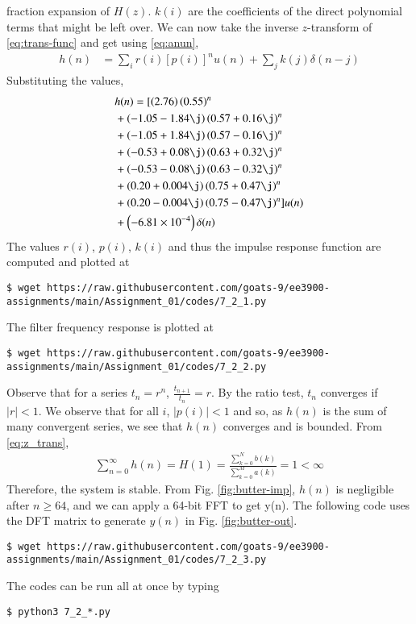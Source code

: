 \documentclass[journal,12pt,twocolumn]{IEEEtran}
\renewcommand\thesection{\arabic{section}}
\begin{document}
\begin{enumerate}[label=\thesection.\arabic*]
fraction expansion of $H(z)$. $k(i)$ are the coefficients of the direct polynomial 
terms that might be left over. We can now take the inverse $z$-transform of
\eqref{eq:trans-func} and get using \eqref{eq:anun},
\begin{align}
	h(n) &= \sum_{i}r(i)[p(i)]^nu(n) + \sum_{j}k(j)\delta(n - j)
	\label{eq:h-n-expr}
\end{align}
Substituting the values,
\begin{align}
	&h(n) = [\brak{2.76}\brak{0.55}^n \nonumber \\ 
	&+ \brak{-1.05-1.84\j}\brak{0.57+0.16\j}^n \nonumber \\
	&+ \brak{-1.05+1.84\j}\brak{0.57-0.16\j}^n \nonumber \\
	&+ \brak{-0.53+0.08\j}\brak{0.63+0.32\j}^n \nonumber \\
	&+ \brak{-0.53-0.08\j}\brak{0.63-0.32\j}^n \nonumber \\
	&+ \brak{0.20+0.004\j}\brak{0.75+0.47\j}^n \nonumber \\
	&+ \brak{0.20-0.004\j}\brak{0.75-0.47\j}^n]u(n) \nonumber \\
	&+ \brak{-6.81 \times 10^{-4}}\delta(n)
\end{align}
The values $r(i)$, $p(i)$, $k(i)$ and thus the impulse response function are computed and plotted at
\begin{lstlisting}
$ wget https://raw.githubusercontent.com/goats-9/ee3900-assignments/main/Assignment_01/codes/7_2_1.py
\end{lstlisting}
The filter frequency response is plotted at
\begin{lstlisting}
$ wget https://raw.githubusercontent.com/goats-9/ee3900-assignments/main/Assignment_01/codes/7_2_2.py
\end{lstlisting}
Observe that for a series $t_n = r^n$, $\frac{t_{n + 1}}{t_n} = r$.
By the ratio test, $t_n$ converges if $|r| < 1$. We observe that for all $i$, 
$|p(i)| < 1$ and so, as $h(n)$ is the sum of many convergent series,
we see that $h(n)$ converges and is bounded. From \eqref{eq:z_trans},
\begin{align}
	\sum_{n = 0}^{\infty}h(n) = H(1) = \frac{\sum_{k = 0}^{N}b(k)}{\sum_{k = 0}^{M}a(k)} = 1 < \infty
\end{align}
Therefore, the system is stable. From
Fig. \eqref{fig:butter-imp}, $h(n)$ is negligible after $n \geq 64$, and we
can apply a 64-bit FFT to get y(n). The following code uses the DFT matrix
to generate $y(n)$ in Fig. \eqref{fig:butter-out}.
\begin{lstlisting}
$ wget https://raw.githubusercontent.com/goats-9/ee3900-assignments/main/Assignment_01/codes/7_2_3.py
\end{lstlisting}
The codes can be run all at once by typing
\begin{lstlisting}
$ python3 7_2_*.py
\end{lstlisting}


\end{enumerate}
\end{document}
